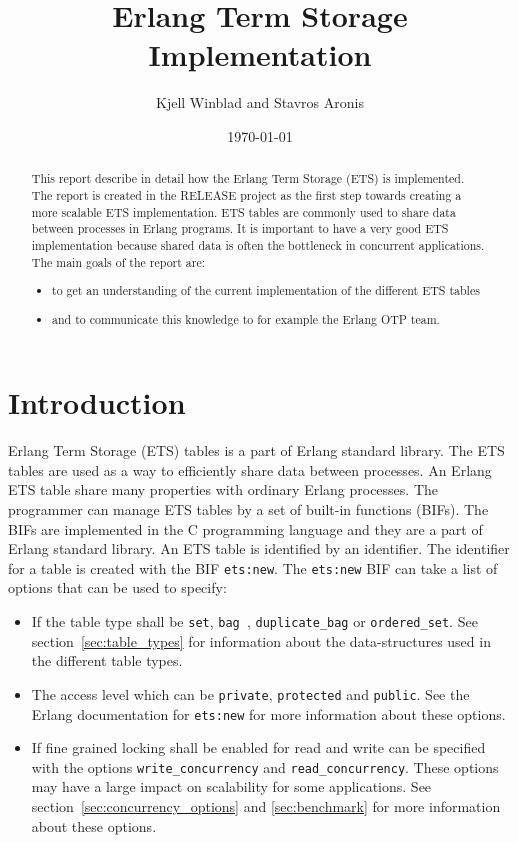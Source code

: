 \documentclass[aps,pre,preprint,nofootinbib]{revtex4}
\begin{document}
\title{Erlang Term Storage Implementation}
\author{Kjell Winblad and Stavros Aronis}
\date{\today}


\begin{abstract}

  This report describe in detail how the Erlang Term Storage (ETS) is implemented.
  The report is created in the RELEASE project as the first step towards creating a more scalable ETS implementation.
  ETS tables are commonly used to share data between processes in Erlang programs.
  It is important to have a very good ETS implementation because shared data is often the bottleneck in concurrent applications.
  The main goals of the report are:
  \begin{itemize}
   \item to get an understanding of the current implementation of the different ETS tables
   \item and to communicate this knowledge to for example the Erlang OTP team. 
  \end{itemize}

\end{abstract}

\maketitle

\section{Introduction}

Erlang Term Storage (ETS) tables is a part of Erlang standard library. 
The ETS tables are used as a way to efficiently share data between processes. 
An Erlang ETS table share many properties with ordinary Erlang processes. 
The programmer can manage ETS tables by a set of built-in functions (BIFs). 
The BIFs are implemented in the C programming language and they are a part of Erlang standard library. An ETS table is identified by an identifier.
The identifier for a table is created with the BIF \verb|ets:new|.
The \verb|ets:new| BIF can take a list of options that can be used to specify: 

\begin{itemize}
 \item 
 If the table type shall be \verb|set|, \verb|bag |, \verb|duplicate_bag| or \verb|ordered_set|. 
 See section~\ref{sec:table_types} for information about the data-structures used in the different table types.
 \item 
 The access level which can be \verb|private|, \verb|protected| and \verb|public|.
 See the Erlang documentation for \verb|ets:new| for more information about these options.
 \item 
 If fine grained locking shall be enabled for read and write can be specified with the options \verb|write_concurrency| and \verb|read_concurrency|. 
 These options may have a large impact on scalability for some applications.
 See section~\ref{sec:concurrency_options} and \ref{sec:benchmark} for more information about these options.
\end{itemize}
\end{document}
